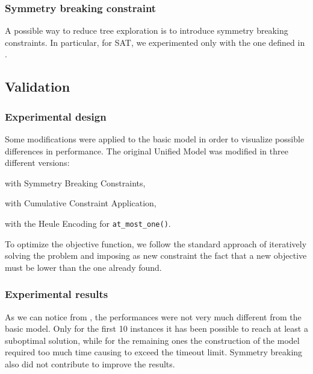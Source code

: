 \subsubsection{Symmetry breaking constraint}

A possible way to reduce tree exploration is to introduce symmetry breaking constraints. In particular, for SAT, we experimented only with the one defined in .


\subsection{Validation}

\subsubsection{Experimental design}

Some modifications were applied to the basic model in order to visualize possible differences in performance.
The original Unified Model was modified in three different versions:
\begin{enumerate*}[label=(\roman*)]
    \item with Symmetry Breaking Constraints,
    \item with Cumulative Constraint Application,
    \item with the Heule Encoding for \texttt{at\_most\_one()}.
\end{enumerate*}

To optimize the objective function, we follow the standard approach of iteratively solving the problem and imposing as new constraint the fact that a new objective must be lower than the one already found.


\subsubsection{Experimental results}

As we can notice from , the performances were not very much different from the basic model. Only for the first 10 instances it has been possible to reach at least a suboptimal solution, while for the remaining ones the construction of the model required too much time causing to exceed the timeout limit. Symmetry breaking also did not contribute to improve the results. 

